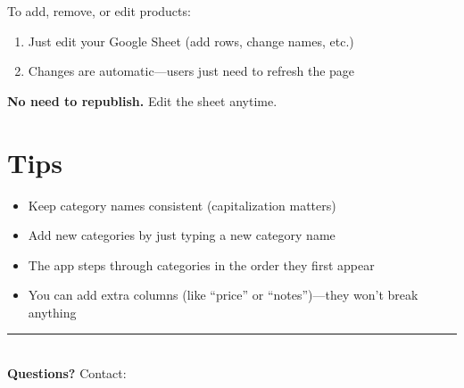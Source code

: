 \documentclass[11pt,letterpaper]{article}
\begin{document}
To add, remove, or edit products:

\begin{enumerate}[leftmargin=*]
    \item Just edit your Google Sheet (add rows, change names, etc.)
    \item Changes are automatic---users just need to refresh the page
\end{enumerate}

\textbf{No need to republish.} Edit the sheet anytime.

\section*{Tips}

\begin{itemize}[leftmargin=*]
    \item Keep category names consistent (capitalization matters)
    \item Add new categories by just typing a new category name
    \item The app steps through categories in the order they first appear
    \item You can add extra columns (like ``price'' or ``notes'')---they won't break anything
\end{itemize}

\vfill

\begin{center}
\rule{0.5\textwidth}{0.4pt}\\[1em]
\textbf{Questions?} Contact: \underline{\hspace{5cm}}
\end{center}
\end{document}

